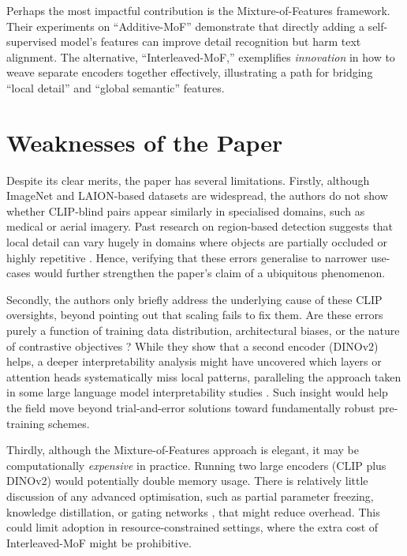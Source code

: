 \documentclass[11pt]{article}
\begin{document}
Perhaps the most impactful contribution is the Mixture-of-Features framework. Their experiments on ``Additive-MoF'' demonstrate that directly adding a self-supervised model's features can improve detail recognition but harm text alignment. The alternative, ``Interleaved-MoF,'' exemplifies \emph{innovation} in how to weave separate encoders together effectively, illustrating a path for bridging ``local detail'' and ``global semantic'' features.

\section*{Weaknesses of the Paper}
Despite its clear merits, the paper has several limitations. Firstly, although ImageNet and LAION-based datasets are widespread, the authors do not show whether CLIP-blind pairs appear similarly in specialised domains, such as medical or aerial imagery. Past research on region-based detection suggests that local detail can vary hugely in domains where objects are partially occluded or highly repetitive \cite{Girshick2014CVPR}. Hence, verifying that these errors generalise to narrower use-cases would further strengthen the paper's claim of a ubiquitous phenomenon.

Secondly, the authors only briefly address the underlying cause of these CLIP oversights, beyond pointing out that scaling fails to fix them. Are these errors purely a function of training data distribution, architectural biases, or the nature of contrastive objectives \cite{Radford2021ICML}? While they show that a second encoder (DINOv2) helps, a deeper interpretability analysis might have uncovered which layers or attention heads systematically miss local patterns, paralleling the approach taken in some large language model interpretability studies \cite{Devlin2019NAACL_BERT}. Such insight would help the field move beyond trial-and-error solutions toward fundamentally robust pre-training schemes.

Thirdly, although the Mixture-of-Features approach is elegant, it may be computationally \emph{expensive} in practice. Running two large encoders (CLIP plus DINOv2) would potentially double memory usage. There is relatively little discussion of any advanced optimisation, such as partial parameter freezing, knowledge distillation, or gating networks \cite{Li2023ICML_BLIP2}, that might reduce overhead. This could limit adoption in resource-constrained settings, where the extra cost of Interleaved-MoF might be prohibitive.
\end{document}
